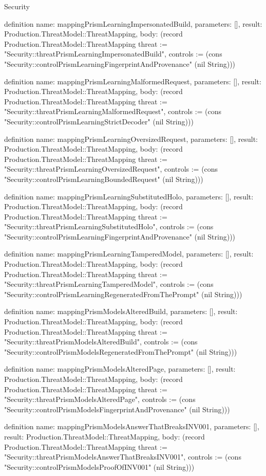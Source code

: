 \begin{lexlean}{Security}
\begin{semanticmodule}
definition{
  name: mappingPrismLearningImpersonatedBuild,
  parameters: [],
  result: Production.ThreatModel::ThreatMapping,
  body: (record Production.ThreatModel::ThreatMapping {threat := "Security::threatPrismLearningImpersonatedBuild", controls := (cons "Security::controlPrismLearningFingerprintAndProvenance" (nil String))})
}

definition{
  name: mappingPrismLearningMalformedRequest,
  parameters: [],
  result: Production.ThreatModel::ThreatMapping,
  body: (record Production.ThreatModel::ThreatMapping {threat := "Security::threatPrismLearningMalformedRequest", controls := (cons "Security::controlPrismLearningStrictDecoder" (nil String))})
}

definition{
  name: mappingPrismLearningOversizedRequest,
  parameters: [],
  result: Production.ThreatModel::ThreatMapping,
  body: (record Production.ThreatModel::ThreatMapping {threat := "Security::threatPrismLearningOversizedRequest", controls := (cons "Security::controlPrismLearningBoundedRequest" (nil String))})
}

definition{
  name: mappingPrismLearningSubstitutedHolo,
  parameters: [],
  result: Production.ThreatModel::ThreatMapping,
  body: (record Production.ThreatModel::ThreatMapping {threat := "Security::threatPrismLearningSubstitutedHolo", controls := (cons "Security::controlPrismLearningFingerprintAndProvenance" (nil String))})
}

definition{
  name: mappingPrismLearningTamperedModel,
  parameters: [],
  result: Production.ThreatModel::ThreatMapping,
  body: (record Production.ThreatModel::ThreatMapping {threat := "Security::threatPrismLearningTamperedModel", controls := (cons "Security::controlPrismLearningRegeneratedFromThePrompt" (nil String))})
}

definition{
  name: mappingPrismModelsAlteredBuild,
  parameters: [],
  result: Production.ThreatModel::ThreatMapping,
  body: (record Production.ThreatModel::ThreatMapping {threat := "Security::threatPrismModelsAlteredBuild", controls := (cons "Security::controlPrismModelsRegeneratedFromThePrompt" (nil String))})
}

definition{
  name: mappingPrismModelsAlteredPage,
  parameters: [],
  result: Production.ThreatModel::ThreatMapping,
  body: (record Production.ThreatModel::ThreatMapping {threat := "Security::threatPrismModelsAlteredPage", controls := (cons "Security::controlPrismModelsFingerprintAndProvenance" (nil String))})
}

definition{
  name: mappingPrismModelsAnswerThatBreaksINV001,
  parameters: [],
  result: Production.ThreatModel::ThreatMapping,
  body: (record Production.ThreatModel::ThreatMapping {threat := "Security::threatPrismModelsAnswerThatBreaksINV001", controls := (cons "Security::controlPrismModelsProofOfINV001" (nil String))})
}


\end{semanticmodule}
\end{lexlean}
